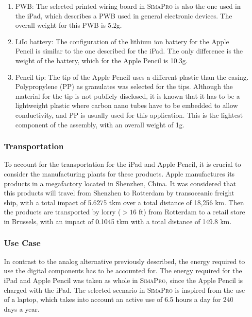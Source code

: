 \begin{enumerate}
\begin{enumerate}
        \item PWB: The selected printed wiring board in \textsc{SimaPro} is also the one used in the iPad, which describes a PWB used in general electronic devices. The overall weight for this PWB is 5.2g. 
        \item LiIo battery: The configuration of the lithium ion battery for the Apple Pencil is similar to the one described for the iPad. The only difference is the weight of the battery, which for the Apple Pencil is 10.3g. 
        \item Pencil tip: The tip of the Apple Pencil uses a different plastic than the casing. Polypropylene (PP) as granulates was selected for the tips. Although the material for the tip is not publicly disclosed, it is known that it has to be a lightweight plastic where carbon nano tubes have to be embedded to allow conductivity, and PP is usually used for this application. This is the lightest component of the assembly, with an overall weight of 1g.  
    \end{enumerate}
\end{enumerate}

\subsubsection*{Transportation}
To account for the transportation for the iPad and Apple Pencil, it is crucial to consider the manufacturing plants for these products. Apple manufactures its products in a megafactory located in Shenzhen, China. It was considered that this products will travel from Shenzhen to Rotterdam by transoceanic freight ship, with a total impact of 5.6275 tkm over a total distance of 18,256 km. Then the products are transported by lorry ($> 16$ ft) from Rotterdam to a retail store in Brussels, with an impact of 0.1045 tkm with a total distance of 149.8 km. 

\subsubsection*{Use Case}
In contrast to the analog alternative previously described, the energy required to use the digital components has to be accounted for. The energy required for the iPad and Apple Pencil was taken as whole in \textsc{SimaPro}, since the Apple Pencil is charged with the iPad. The selected scenario in \textsc{SimaPro} is inspired from the use of a laptop, which takes into account an active use of 6.5 hours a day for 240 days a year. 

